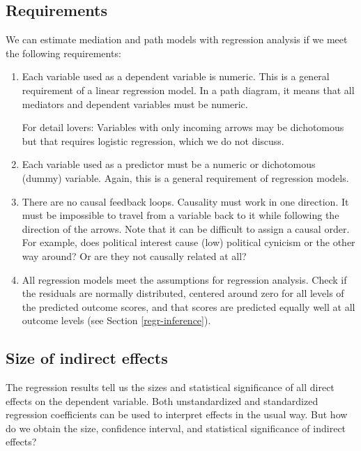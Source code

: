 \documentclass[a4paper]{book}
\theoremstyle{definition}
\theoremstyle{definition}
\theoremstyle{definition}
\theoremstyle{remark}
\begin{document}
\subsection{Requirements}\label{requirements}

We can estimate mediation and path models with regression analysis if we
meet the following requirements:

\begin{enumerate}
\def\labelenumi{\arabic{enumi}.}
\item
  Each variable used as a dependent variable is numeric. This is a
  general requirement of a linear regression model. In a path diagram,
  it means that all mediators and dependent variables must be numeric.

  For detail lovers: Variables with only incoming arrows may be
  dichotomous but that requires logistic regression, which we do not
  discuss.
\item
  Each variable used as a predictor must be a numeric or dichotomous
  (dummy) variable. Again, this is a general requirement of regression
  models.
\item
  There are no causal feedback loops. Causality must work in one
  direction. It must be impossible to travel from a variable back to it
  while following the direction of the arrows. Note that it can be
  difficult to assign a causal order. For example, does political
  interest cause (low) political cynicism or the other way around? Or
  are they not causally related at all?
\item
  All regression models meet the assumptions for regression analysis.
  Check if the residuals are normally distributed, centered around zero
  for all levels of the predicted outcome scores, and that scores are
  predicted equally well at all outcome levels (see Section
  \ref{regr-inference}).
\end{enumerate}

\subsection{Size of indirect effects}\label{size-indirect-effects}

The regression results tell us the sizes and statistical significance of
all direct effects on the dependent variable. Both unstandardized and
standardized regression coefficients can be used to interpret effects in
the usual way. But how do we obtain the size, confidence interval, and
statistical significance of indirect effects?
\end{document}

